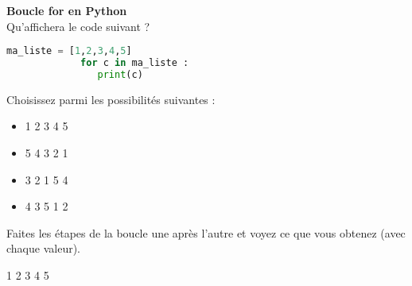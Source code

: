      	
    \begin{Exercice}[5 minutes] \textbf{Boucle for en Python}\\
      	Qu'affichera le code suivant ?
      	
      	\begin{lstlisting}[language=Python]
             ma_liste = [1,2,3,4,5]
             for c in ma_liste :
             	print(c) 
             	\end{lstlisting}
             	
        Choisissez parmi les possibilités suivantes :
        
        \begin{itemize}
        \item 
        1  
        2 
        3 
        4 
        5 
        \item 
        5 
        4 
        3 
        2 
        1 
        \item 3 
        2 
        1 
        5 
        4 
        \item 4 
        3 
        5 
        1 
        2
        \end{itemize}
    
        \begin{conseil}
		   Faites les étapes de la boucle une après l'autre et voyez ce que vous obtenez (avec chaque valeur).  
        \end{conseil}
        
        \begin{solution}
            1 
            2 
            3 
            4 
            5
        \end{solution}
    \end{Exercice}
    
